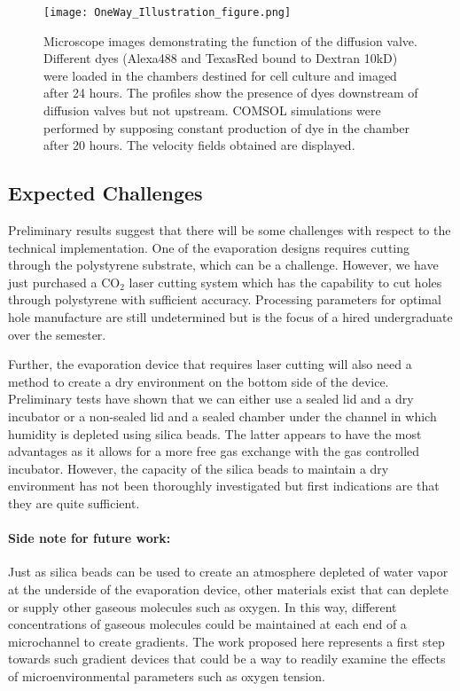 \begin{figure}[!ht]
\begin{center}
\texttt{[image: OneWay\_Illustration\_figure.png]}
\caption{Microscope images demonstrating the function of the diffusion valve. Different dyes (Alexa488 and TexasRed bound to Dextran 10kD) were loaded in the chambers destined for cell culture and imaged after 24 hours. The profiles show the presence of dyes downstream of diffusion valves but not upstream. COMSOL simulations were performed by supposing constant production of dye in the chamber after 20 hours. The velocity fields obtained are displayed.}
\label{fig:oneWayDye}
\end{center}
\end{figure}

\subsection{Expected Challenges}
Preliminary results suggest that there will be some challenges with respect to the technical implementation. One of the evaporation designs requires cutting through the polystyrene substrate, which can be a challenge. However, we have just purchased a CO$_{2}$ laser cutting system which has the capability to cut holes through polystyrene with sufficient accuracy. Processing parameters for optimal hole manufacture are still undetermined but is the focus of a hired undergraduate over the semester.

Further, the evaporation device that requires laser cutting will also need a method to create a dry environment on the bottom side of the device. Preliminary tests have shown that we can either use a sealed lid and a dry incubator or a non-sealed lid and a sealed chamber under the channel in which humidity is depleted using silica beads. The latter appears to have the most advantages as it allows for a more free gas exchange with the gas controlled incubator. However, the capacity of the silica beads to maintain a dry environment has not been thoroughly investigated but first indications are that they are quite sufficient.

\paragraph{Side note for future work:}Just as silica beads can be used to create an atmosphere depleted of water vapor at the underside of the evaporation device, other materials exist that can deplete or supply other gaseous molecules such as oxygen. In this way, different concentrations of gaseous molecules could be maintained at each end of a microchannel to create gradients. The work proposed here represents a first step towards such gradient devices that could be a way to readily examine the effects of microenvironmental parameters such as oxygen tension.





